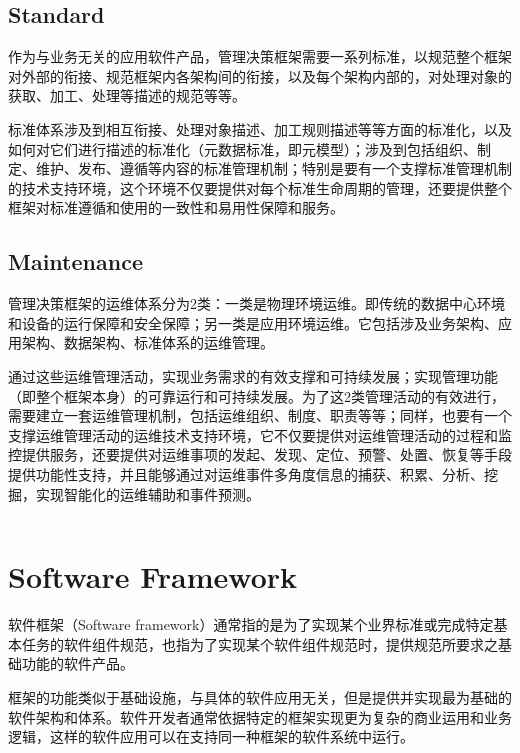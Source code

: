\subsection{Standard}

作为与业务无关的应用软件产品，管理决策框架需要一系列标准，以规范整个框架对外部的衔接、规范框架内各架构间的衔接，以及每个架构内部的，对处理对象的获取、加工、处理等描述的规范等等。

标准体系涉及到相互衔接、处理对象描述、加工规则描述等等方面的标准化，以及如何对它们进行描述的标准化（元数据标准，即元模型）；涉及到包括组织、制定、维护、发布、遵循等内容的标准管理机制；特别是要有一个支撑标准管理机制的技术支持环境，这个环境不仅要提供对每个标准生命周期的管理，还要提供整个框架对标准遵循和使用的一致性和易用性保障和服务。


\subsection{Maintenance}



管理决策框架的运维体系分为2类：一类是物理环境运维。即传统的数据中心环境和设备的运行保障和安全保障；另一类是应用环境运维。它包括涉及业务架构、应用架构、数据架构、标准体系的运维管理。

通过这些运维管理活动，实现业务需求的有效支撑和可持续发展；实现管理功能（即整个框架本身）的可靠运行和可持续发展。为了这2类管理活动的有效进行，需要建立一套运维管理机制，包括运维组织、制度、职责等等；同样，也要有一个支撑运维管理活动的运维技术支持环境，它不仅要提供对运维管理活动的过程和监控提供服务，还要提供对运维事项的发起、发现、定位、预警、处置、恢复等手段提供功能性支持，并且能够通过对运维事件多角度信息的捕获、积累、分析、挖掘，实现智能化的运维辅助和事件预测。


\begin{lstlisting}[language=PHP]

\end{lstlisting}


\section{Software Framework}

软件框架（Software framework）通常指的是为了实现某个业界标准或完成特定基本任务的软件组件规范，也指为了实现某个软件组件规范时，提供规范所要求之基础功能的软件产品。

框架的功能类似于基础设施，与具体的软件应用无关，但是提供并实现最为基础的软件架构和体系。软件开发者通常依据特定的框架实现更为复杂的商业运用和业务逻辑，这样的软件应用可以在支持同一种框架的软件系统中运行。

